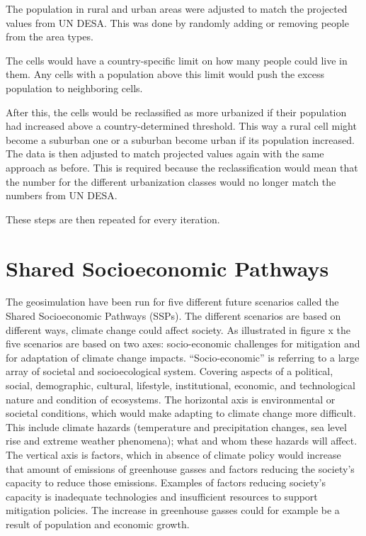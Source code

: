 The population in rural and urban areas were adjusted to match the projected values from UN DESA. This was done by randomly adding or removing people from the area types. 

The cells would have a country-specific limit on how many people could live in them. Any cells with a population above this limit would push the excess population to neighboring cells. 

After this, the cells would be reclassified as more urbanized if their population had increased above a country-determined threshold. This way a rural cell might become a suburban one or a suburban become urban if its population increased. The data is then adjusted to match projected values again with the same approach as before. This is required because the reclassification would mean that the number for the different urbanization classes would no longer match the numbers from UN DESA.

These steps are then repeated for every iteration. 

\citep{Kessler}
\section{Shared Socioeconomic Pathways} \label{SSPs}



The geosimulation have been run for five different future scenarios called the Shared Socioeconomic Pathways (SSPs). The different scenarios are based on different ways, climate change could affect society. As illustrated in figure x the five scenarios are based on two axes: socio-economic challenges for mitigation and for adaptation of climate change impacts. 
“Socio-economic” is referring to a large array of societal and socioecological system. Covering aspects of a political, social, demographic, cultural, lifestyle, institutional, economic, and technological nature and condition of ecosystems. 
The horizontal axis is environmental or societal conditions, which would make adapting to climate change more difficult. This include climate hazards (temperature and precipitation changes, sea level rise and extreme weather phenomena); what and whom these hazards will affect.
\citep{ConceptSSP}
The vertical axis is factors, which in absence of climate policy would increase that amount of emissions of greenhouse gasses and factors reducing the society’s capacity to reduce those emissions. Examples of factors reducing society’s capacity is inadequate technologies and insufficient resources to support mitigation policies. The increase in greenhouse gasses could for example be a result of population and economic growth.
\citep{SSP}

